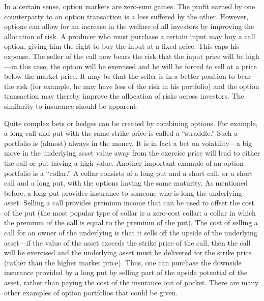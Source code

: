 In a certain sense, option markets are zero-sum games.  The profit earned by one counterparty to an option transaction is a loss suffered by the other.  However, options can allow for an increase in the welfare of all investors by improving the allocation of risk.  A producer who must purchase a certain input may buy a call option, giving him the right to buy the input at a fixed price.  This caps his expense.  The seller of the call now bears the risk that the input price will be high---in this case, the option will be exercised and he will be forced to sell at a price below the market price.  It may be that the seller is in a better position to bear the risk (for example, he may have less of the risk in his portfolio) and the option transaction may thereby improve the allocation of risks across investors.  The similarity to insurance should be apparent.

Quite complex bets or hedges can be created by combining options.  For example, a long call and put with the same strike price is called a ``straddle.''   Such a portfolio is (almost) always in the money.  It is in fact a bet on volatility---a big move in the underlying asset value away from the exercise price will lead to either the call or put having a high value.  Another important example of an option portfolio is a ``collar.''   A collar consists of a long put and a short call, or a short call and a long put, with the options having the same maturity.  As mentioned before, a long put provides insurance to someone who is long the underlying asset.  Selling a call provides premium income that can be used to offset the cost of the put (the most popular type of collar is a zero-cost collar:  a collar in which the premium of the call is equal to the premium of the put).  The cost of selling a call for an owner of the underlying is that it sells off the upside of the underlying asset---if the value of the asset exceeds the strike price of the call, then the call will be exercised and the underlying asset must be delivered for the strike price (rather than the higher market price).  Thus, one can purchase the downside insurance provided by a long put by selling part of the upside potential of the asset, rather than paying the cost of the insurance out of pocket.  There are many other examples of option portfolios that could be given.  

